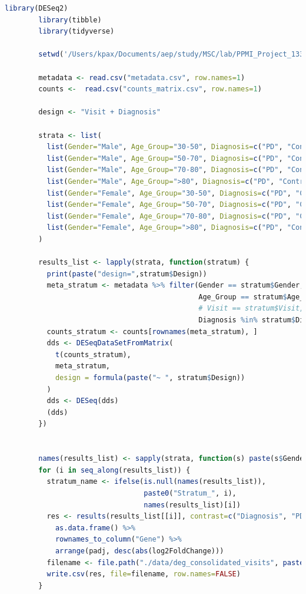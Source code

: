 \documentclass[12pt]{report}
\begin{document}
    \begin{lstlisting}[language=R,caption={Main.R: Διαφορική ανάλυση μέσω πακέτου R DESeq2},label=lst:mainr]
        library(DESeq2)
        library(tibble)
        library(tidyverse)
        
        setwd('/Users/kpax/Documents/aep/study/MSC/lab/PPMI_Project_133_RNASeq')
        
        metadata <- read.csv("metadata.csv", row.names=1)
        counts <-  read.csv("counts_matrix.csv", row.names=1)
        
        design <- "Visit + Diagnosis"
        
        strata <- list(
          list(Gender="Male", Age_Group="30-50", Diagnosis=c("PD", "Control"), Design=design),
          list(Gender="Male", Age_Group="50-70", Diagnosis=c("PD", "Control"), Design=design),
          list(Gender="Male", Age_Group="70-80", Diagnosis=c("PD", "Control"), Design=design),
          list(Gender="Male", Age_Group=">80", Diagnosis=c("PD", "Control"), Design=design),
          list(Gender="Female", Age_Group="30-50", Diagnosis=c("PD", "Control"), Design=design),
          list(Gender="Female", Age_Group="50-70", Diagnosis=c("PD", "Control"), Design=design),
          list(Gender="Female", Age_Group="70-80", Diagnosis=c("PD", "Control"), Design=design),
          list(Gender="Female", Age_Group=">80", Diagnosis=c("PD", "Control"), Design=design)
        )
        
        results_list <- lapply(strata, function(stratum) {
          print(paste("design=",stratum$Design))
          meta_stratum <- metadata %>% filter(Gender == stratum$Gender,
                                              Age_Group == stratum$Age_Group,
                                              # Visit == stratum$Visit,
                                              Diagnosis %in% stratum$Diagnosis)
          counts_stratum <- counts[rownames(meta_stratum), ]
          dds <- DESeqDataSetFromMatrix(
            t(counts_stratum),
            meta_stratum,
            design = formula(paste("~ ", stratum$Design))
          )
          dds <- DESeq(dds)
          (dds)
        })
        
        
        names(results_list) <- sapply(strata, function(s) paste(s$Gender, s$Age_Group, sep="_"))
        for (i in seq_along(results_list)) {
          stratum_name <- ifelse(is.null(names(results_list)),
                                 paste0("Stratum_", i),
                                 names(results_list)[i])
          res <- results(results_list[[i]], contrast=c("Diagnosis", "PD", "Control")) %>%
            as.data.frame() %>%
            rownames_to_column("Gene") %>%
            arrange(padj, desc(abs(log2FoldChange)))
          filename <- file.path("./data/deg_consolidated_visits", paste0("DEGs_stratified_consoVisits_", stratum_name, ".csv"))
          write.csv(res, file=filename, row.names=FALSE)
        }
    \end{lstlisting}
\end{document}
